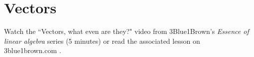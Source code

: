 \section{Vectors}

Watch the ``Vectors, what even are they?" video from 3Blue1Brown's
\textit{Essence of linear algebra} series (5 minutes) or read the associated
lesson on 3blue1brown.com
\cite{bib:3b1b_linalg_vectors}.
